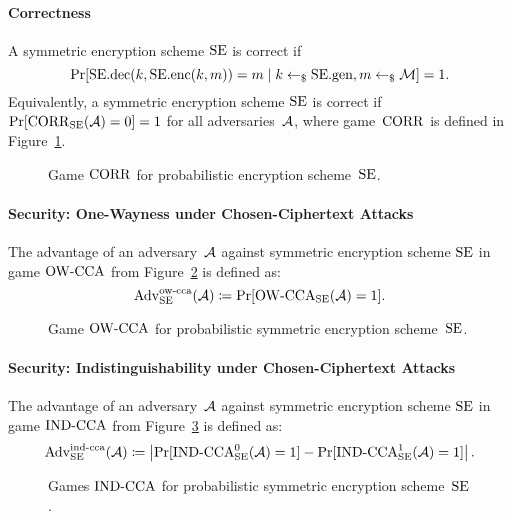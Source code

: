 \documentclass[a4paper,orivec]{llncs}
\begin{document}
\paragraph{Correctness}
A symmetric encryption scheme $\mathrm{SE}$ is correct if 
\[
\Pr[\mathrm{SE}.\mathrm{dec}(k,\mathrm{SE}.\mathrm{enc}(k,m))=m\mid k\gets_\$\mathrm{SE}.\mathrm{gen},m\gets_\$\mathcal{M}]=1\text{.}
\]
Equivalently, a symmetric encryption scheme $\mathrm{SE}$ is correct if $\Pr[\mathrm{CORR}_{\mathrm{SE}}(\mathcal{A})=0]=1$ for all adversaries~$\mathcal{A}$, where game~$\mathrm{CORR}$ is defined in Figure~\ref{fig:sym:enc:corr:prob}.

\begin{figure}[!ht]
    \centering
    \nicoresetlinenr%
    \fbox{%
        \scalebox{\codescalefactor}{%
        }%
    }
    \caption{%
        Game $\mathrm{CORR}$ for probabilistic encryption scheme~$\mathrm{SE}$.
    }
    \label{fig:sym:enc:corr:prob}
\end{figure}

\paragraph{Security: One-Wayness under Chosen-Ciphertext Attacks}
The advantage of an adversary~$\mathcal{A}$ against symmetric encryption scheme $\mathrm{SE}$ in game ${\mathrm{OW}\text{-}\mathrm{CCA}}$ from Figure~\ref{fig:sym:enc:ow:prob} is defined as:
\[
\mathrm{Adv}_{\mathrm{SE}}^{\mathrm{ow}\text{-}\mathrm{cca}}(\mathcal{A})\coloneqq\Pr[{\mathrm{OW}\text{-}\mathrm{CCA}}_{\mathrm{SE}}(\mathcal{A})=1]\text{.}
\]

\begin{figure}[!ht]
    \centering
    \nicoresetlinenr%
    \fbox{%
        \scalebox{\codescalefactor}{%
        }%
    }
    \caption{%
        Game ${\mathrm{OW}\text{-}\mathrm{CCA}}$ for probabilistic symmetric encryption scheme~$\mathrm{SE}$.
    }
    \label{fig:sym:enc:ow:prob}
\end{figure}

\paragraph{Security: Indistinguishability under Chosen-Ciphertext Attacks}
The advantage of an adversary~$\mathcal{A}$ against symmetric encryption scheme $\mathrm{SE}$ in game ${\mathrm{IND}\text{-}\mathrm{CCA}}$ from Figure~\ref{fig:sym:enc:ind:prob} is defined as:
\[
\mathrm{Adv}_{\mathrm{SE}}^{\mathrm{ind}\text{-}\mathrm{cca}}(\mathcal{A})\coloneqq\left|\Pr[{\mathrm{IND}\text{-}\mathrm{CCA}}_{\mathrm{SE}}^0(\mathcal{A})=1]-\Pr[{\mathrm{IND}\text{-}\mathrm{CCA}}_{\mathrm{SE}}^1(\mathcal{A})=1]\right|\text{.}
\]

\begin{figure}[!ht]
    \centering
    \nicoresetlinenr%
    \fbox{%
        \scalebox{\codescalefactor}{%
        }%
    }
    \caption{%
        Games ${\mathrm{IND}\text{-}\mathrm{CCA}}$ for probabilistic symmetric encryption scheme~$\mathrm{SE}$.
    }
    \label{fig:sym:enc:ind:prob}
\end{figure}
\end{document}
